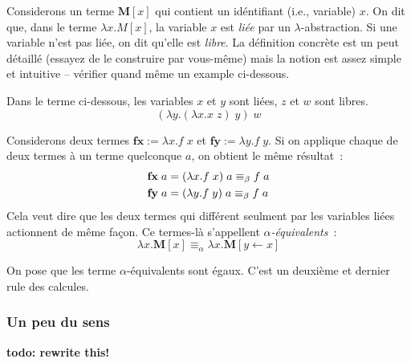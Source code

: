 

Considerons un terme $\mathbf{M}[x]$ qui contient un idéntifiant (i.e., variable) $x$.
On dit que, dans le terme $\lambda x.M[x]$, la variable $x$ est \emph{liée} par un $\lambda$-abstraction.
Si une variable n'est pas liée, on dit qu'elle est \emph{libre}.
La définition concrète est un peut détaillé (essayez de le construire par vous-même) mais la notion est assez simple et intuitive -- vérifier quand même un example ci-dessous.
\begin{example}
	Dans le terme ci-dessous, les variables $x$ et $y$ sont liées, $z$ et $w$ sont libres.
	$$(\lambda y. (\lambda x. x \; z) \; y) \; w$$
\end{example}
Considerons deux termes $\mathbf{fx} := \lambda x. f \; x$ et $\mathbf{fy} := \lambda y. f \; y$.
Si on applique chaque de deux termes à un terme quelconque $a$, on obtient le même résultat~:
\begin{align*}
	\mathbf{fx} \; a &= (\lambda x. f \; x) \; a \equiv_\beta f \; a \\
	\mathbf{fy} \; a &= (\lambda y. f \; y) \; a \equiv_\beta f \; a
\end{align*}
Cela veut dire que les deux termes qui différent seulment par les variables liées actionnent de même façon.
Ce termes-là s'appellent \emph{$\alpha$-équivalents}~:
$$\lambda x. \mathbf{M}[x] \equiv_\alpha \lambda x. \mathbf{M}[y \leftarrow x]$$

On pose que les terme $\alpha$-équivalents sont égaux.
C'est un deuxième et dernier rule des calcules.

\subsubsection*{Un peu du sens}
\textbf{todo: rewrite this!}

